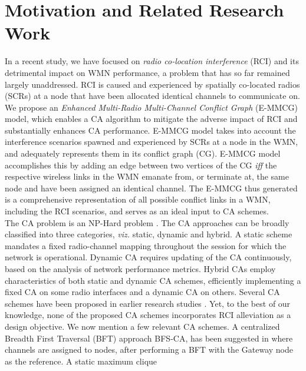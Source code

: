 \documentclass[conference]{IEEEtran}
\begin{document}
\section{Motivation and Related Research Work}
In a recent study, we have focused on \textit{radio co-location interference} (RCI) \cite{Manas} and its detrimental impact on WMN performance, a problem that has so far remained largely unaddressed. RCI is caused and experienced by spatially co-located radios (SCRs) at a node that have been allocated identical channels to communicate on. We propose an \textit{Enhanced Multi-Radio Multi-Channel Conflict Graph} (E-MMCG) model, which enables a CA algorithm to mitigate the adverse impact of RCI and substantially enhances CA performance. E-MMCG model takes into account the interference scenarios spawned and experienced by SCRs at a node in the WMN, and adequately represents them in its conflict graph (CG). E-MMCG model accomplishes this by adding an edge between two vertices of the CG \textit{iff} the respective wireless links in the WMN emanate from, or terminate at, the same node and have been assigned an identical channel. The E-MMCG thus generated is a comprehensive representation of all possible conflict 
links in a WMN, including the RCI scenarios, and serves as an ideal input to CA schemes.\\
The CA problem is an NP-Hard problem \cite{NPcomplete}. The CA approaches can be broadly classified into three categories, \emph{viz.} static, dynamic and hybrid. A static scheme mandates a fixed radio-channel mapping throughout the session for which the network is operational. Dynamic CA requires updating of the CA continuously, based on the analysis of network performance metrics. Hybrid CAs employ characteristics of both static and dynamic CA schemes, efficiently implementing a fixed CA on some radio interfaces and a dynamic CA on others. Several CA schemes have been proposed in earlier research studies \cite{Ding}. Yet, to the best of our knowledge, none of the proposed CA schemes incorporates RCI alleviation as a design objective. We now mention a few relevant CA schemes. A centralized Breadth First Traversal (BFT) approach BFS-CA, has been suggested in  \cite{22Ramachandran} where channels are assigned to nodes, after performing a BFT with the Gateway node as the reference. A static maximum clique 
\end{document}
